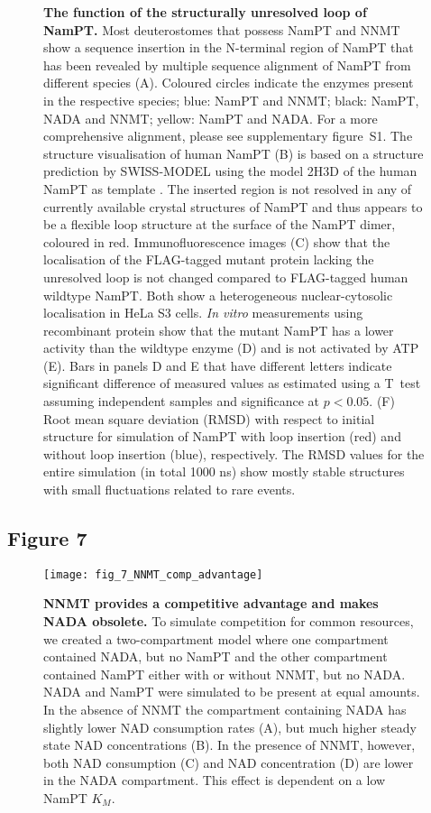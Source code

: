 \begin{figure}[ht]
  \caption{\textbf{The function of the structurally unresolved loop of NamPT.} Most deuterostomes that possess NamPT and NNMT show a sequence insertion in the N-terminal region of NamPT that has been revealed by multiple sequence alignment of NamPT from different species (A). Coloured circles indicate the enzymes present in the respective species; blue: NamPT and NNMT; black: NamPT, NADA and NNMT; yellow: NamPT and NADA. For a more comprehensive alignment, please see supplementary figure~S1. The structure visualisation of human NamPT (B) is based on a structure prediction by SWISS-MODEL \cite{Arnold2006,Biasini2014} using the model 2H3D of the human NamPT as template \cite{Wang2006}. The inserted region is not resolved in any of currently available crystal structures of NamPT and thus appears to be a flexible loop structure at the surface of the NamPT dimer, coloured in red. Immunofluorescence images (C) show that the localisation of the FLAG-tagged mutant protein lacking the unresolved loop is not changed compared to FLAG-tagged human wildtype NamPT. Both show a heterogeneous nuclear-cytosolic localisation in HeLa S3 cells. \textit{In vitro} measurements using recombinant protein show that the mutant NamPT has a lower activity than the wildtype enzyme (D) and is not activated by ATP (E). Bars in panels D and E that have different letters indicate significant difference of measured values as estimated using a T~test assuming independent samples and significance at $p < 0.05$. (F) Root mean square deviation (RMSD) with respect to initial structure for simulation of NamPT with loop insertion (red) and without loop insertion (blue), respectively. The RMSD values for the entire simulation (in total 1000 ns) show mostly stable structures with small fluctuations related to rare events.}
  \label{fig:unresolved_loop}
\end{figure}

\newpage


\subsection*{Figure 7}

\begin{figure}[ht]
  \centering
  \texttt{[image: fig\_7\_NNMT\_comp\_advantage]}
  \caption{\textbf{NNMT provides a competitive advantage and makes NADA obsolete.} To simulate competition for common resources, we created a two-compartment model where one compartment contained NADA, but no NamPT and the other compartment contained NamPT either with or without NNMT, but no NADA. NADA and NamPT were simulated to be present at equal amounts. In the absence of NNMT the compartment containing NADA has slightly lower NAD consumption rates (A), but much higher steady state NAD concentrations (B). In the presence of NNMT, however, both NAD consumption (C) and NAD concentration (D) are lower in the NADA compartment. This effect is dependent on a low NamPT $K_{M}$.}
  \label{fig:NNMT_comp_advantage}
\end{figure}

